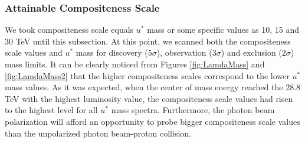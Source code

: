 \documentclass{appolb}
\begin{document}
\subsubsection{Attainable Compositeness Scale}

We took compositeness scale equals $u^*$ mass or some specific values as 10, 15 and 30 TeV until this subsection. At this point, we scanned both the compositeness scale values and  $u^*$ mass for  discovery ($5\sigma$), observation ($3\sigma$) and exclusion ($2\sigma$) mass limits.  It can be clearly noticed from Figures \ref{fig:LamdaMass} and \ref{fig:LamdaMass2} that the higher compositeness scales correspond to the lower $u^*$ mass values. As it was expected, when the center of mass energy reached the 28.8 TeV with the highest luminosity value, the compositeness scale values had risen to the highest level for all $u^*$ mass spectra. Furthermore, the photon beam polarization will afford an opportunity to probe bigger compositeness scale values than the unpolarized photon beam-proton collision. 
\end{document}
